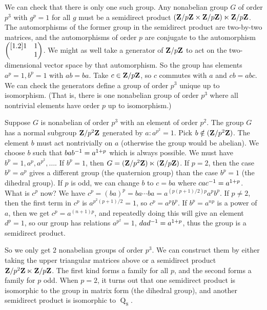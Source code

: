 \documentclass[11pt, twoside]{amsart}
\begin{document}
We can check that there is only one such group. Any nonabelian group $G$ of order $p^3$ with $g^p = 1$ for all $g$ must be a semidirect product $(\mathbf{Z}/p\mathbf{Z} \times \mathbf{Z}/p\mathbf{Z})\ltimes \mathbf{Z}/p\mathbf{Z}$. The automorphisms of the former group in the semidirect product are two-by-two matrices, and the automorphisms of order $p$ are conjugate to the automorphism $\begin{pmatrix} [1.2] 1 & 1 \\ &1\end{pmatrix}$. We might as well take a generator of $\mathbf{Z}/p\mathbf{Z}$ to act on the two-dimensional vector space by that automorphism. So the group has elements $a^p=1, b^p =1$ with $ab=ba$. Take $c \in \mathbf{Z}/p\mathbf{Z}$, so $c$ commutes with $a$ and $cb = abc$. We can check the generators define a group of order $p^3$ unique up to isomorphism. (That is, there is one nonabelian group of order $p^3$ where all nontrivial elements have order $p$ up to isomorphism.)

Suppose $G$ is nonabelian of order $p^3$ with an element of order $p^2$. The group $G$ has a normal subgroup $\mathbf{Z}/ {p^2}\mathbf{Z} $ generated by $a : a^{p^2}= 1$. Pick $b \notin (\mathbf{Z}/p^2\mathbf{Z})$. The element $b$ must act nontrivially on $a$ (otherwise the group would be abelian). We choose $b$ such that $bab^{-1} = a^{1+p}$ which is always possible. We must have $b^p=1,a^p,a^{p^2},\hdots$. If $b^p=1$, then $G = (\mathbf{Z}/{p^2}\mathbf{Z})\ltimes (\mathbf{Z}/ p\mathbf{Z})$. If $p=2$, then the case $b^p = a^p $ gives a different group (the quaternion group) than the case $b^p = 1 $ (the dihedral group). If $p$ is odd, we can change $b$ to $c=ba$ where $cac^{-1} = a^{1+p}$. What is $c^p$ now? We have $c^p = (ba)^p = ba\cdots ba = a^{(p(p+1)/2)p}a^pb^p$. If $p\ne 2$, then the first term in $c^p$ is $a^{p^2(p+1)/2} = 1$, so $c^p = a^pb^p$. If $b^p = a^{np}$ is a power of $a$, then we get $c^p = a^{(n+1)p}$, and repeatedly doing this will give an element $d^{p} = 1$, so our group has relations $a^{p^2} = 1$, $dad^{-1} = a^{1+p}$, thus the group is a semidirect product.

So we only get $2$ nonabelian groups of order $p^3$. We can construct them by either taking the upper triangular matrices above or a semidirect product $\mathbf{Z}/p^2\mathbf{Z} \ltimes \mathbf{Z}/p\mathbf{Z}$. The first kind forms a family for all $p$, and the second forms a family for $p$ odd. When $p=2$, it turns out that one semidirect product is isomorphic to the group in matrix form (the dihedral group), and another semidirect product is isomorphic to $\operatorname{Q}_8 $. 
\end{document}
